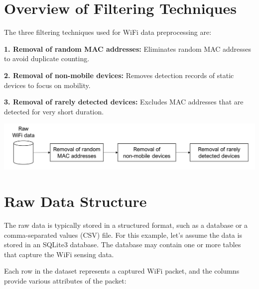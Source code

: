 \documentclass[
  letterpaper,
]{scrbook}
\begin{document}
\section{Overview of Filtering
Techniques}\label{overview-of-filtering-techniques}

The three filtering techniques used for WiFi data preprocessing are:

\textbf{1. Removal of random MAC addresses:} Eliminates random MAC
addresses to avoid duplicate counting.

\textbf{2. Removal of non-mobile devices:} Removes detection records of
static devices to focus on mobility.

\textbf{3. Removal of rarely detected devices:} Excludes MAC addresses
that are detected for very short duration.

\includegraphics{content/material/ch3/preprocessing.png}

\section{Raw Data Structure}\label{raw-data-structure}

The raw data is typically stored in a structured format, such as a
database or a comma-separated values (CSV) file. For this example, let's
assume the data is stored in an SQLite3 database. The database may
contain one or more tables that capture the WiFi sensing data.

Each row in the dataset represents a captured WiFi packet, and the
columns provide various attributes of the packet:
\end{document}
